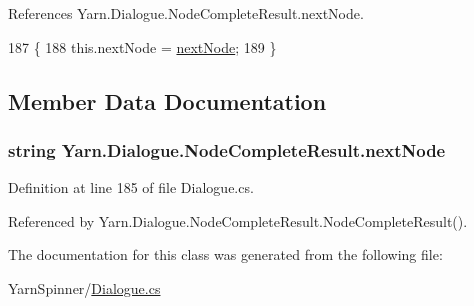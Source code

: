 References Yarn.\-Dialogue.\-Node\-Complete\-Result.\-next\-Node.


\begin{DoxyCode}
187                                                         \{
188                 this.nextNode = \hyperlink{a00139_ad48b37b51066b94cd48c58626ac0e774}{nextNode};
189             \}
\end{DoxyCode}


\subsection{Member Data Documentation}
\hypertarget{a00139_ad48b37b51066b94cd48c58626ac0e774}{
\subsubsection[{next\-Node}]{\setlength{\rightskip}{0pt plus 5cm}string Yarn.\-Dialogue.\-Node\-Complete\-Result.\-next\-Node}}\label{a00139_ad48b37b51066b94cd48c58626ac0e774}


Definition at line 185 of file Dialogue.\-cs.



Referenced by Yarn.\-Dialogue.\-Node\-Complete\-Result.\-Node\-Complete\-Result().



The documentation for this class was generated from the following file\-:\begin{DoxyCompactItemize}
\item 
Yarn\-Spinner/\hyperlink{a00305}{Dialogue.\-cs}\end{DoxyCompactItemize}

